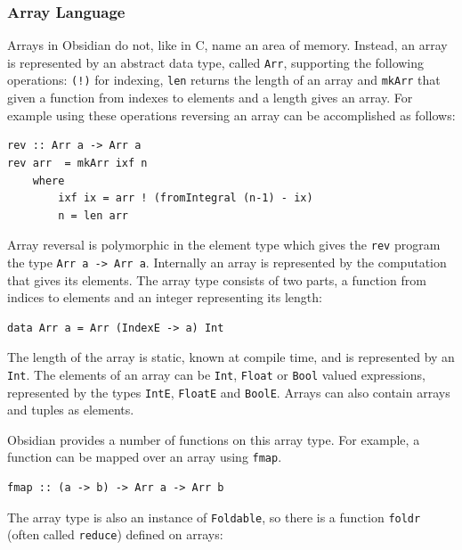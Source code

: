 \subsubsection{Array Language}
\label{sec:ArrayLanguage}
\FloatBarrier
Arrays in Obsidian do not, like in C, name an area of memory. Instead, an 
array is represented by an abstract data type, called {\tt Arr}, supporting 
the following operations: {\tt (!)} for indexing, {\tt len} 
returns the length of an array and {\tt mkArr} that given a function from 
indexes to elements and a length gives an array. For example using these 
operations reversing an array can be accomplished as follows: 

\begin{small}
\begin{verbatim}
rev :: Arr a -> Arr a 
rev arr  = mkArr ixf n
    where 
        ixf ix = arr ! (fromIntegral (n-1) - ix)
        n = len arr 
\end{verbatim}
\end{small}
\noindent
Array reversal is polymorphic in the element type which gives the {\tt rev} 
program the type {\tt Arr a -> Arr a}. 
Internally an array is represented by the computation that gives its elements. 
The array type consists of two parts, a function from indices to elements and an 
integer representing its length:
\begin{small}
\begin {verbatim} 
data Arr a = Arr (IndexE -> a) Int 
\end{verbatim}
\end{small}
\noindent 
The length of the array is static, known at compile time, and is represented
by an {\tt Int}. The elements of an array can be {\tt Int}, {\tt Float} or 
{\tt Bool} valued expressions, represented by the types {\tt IntE}, 
{\tt FloatE} and {\tt BoolE}. Arrays can also contain arrays and tuples 
as elements. 

Obsidian provides a number of functions on this array type. For example, 
a function can be mapped over an array using {\tt fmap}. 

\begin{small}
\begin{verbatim}
fmap :: (a -> b) -> Arr a -> Arr b
\end{verbatim}
\end{small}
\noindent
The array type is also an instance of {\tt Foldable}, so there is a function 
{\tt foldr} (often called {\tt reduce}) defined on arrays: 

